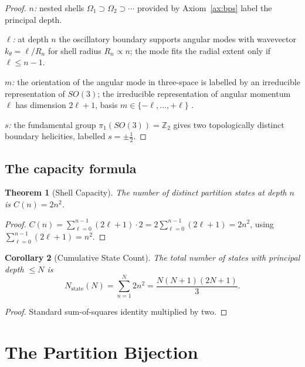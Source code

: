 \documentclass[twocolumn,10pt,a4paper]{article}
\theoremstyle{thmstyle}
\newtheorem{theorem}{Theorem}[section]
\newtheorem{corollary}[theorem]{Corollary}
\theoremstyle{definition}
\theoremstyle{remark}
\begin{document}
\begin{proof}
\emph{$n$:} nested shells $\Omega_{1}\supset\Omega_{2}\supset\cdots$
provided by Axiom~\ref{ax:bps} label the principal depth.

\emph{$\ell$:} at depth $n$ the oscillatory boundary supports angular
modes with wavevector $k_{\theta}=\ell/R_{n}$ for shell radius
$R_{n}\propto n$; the mode fits the radial extent only if
$\ell\leq n-1$.

\emph{$m$:} the orientation of the angular mode in three-space is
labelled by an irreducible representation of $SO(3)$; the irreducible
representation of angular momentum $\ell$ has dimension $2\ell+1$,
basis $m\in\{-\ell,\ldots,+\ell\}$ \citep{hall2015}.

\emph{$s$:} the fundamental group $\pi_{1}(SO(3))=\mathbb{Z}_{2}$
\citep{nakahara2003} gives two topologically distinct boundary
helicities, labelled $s=\pm\tfrac{1}{2}$.
\end{proof}

\subsection{The capacity formula}

\begin{theorem}[Shell Capacity]
\label{thm:cap}
The number of distinct partition states at depth $n$ is
$C(n)=2n^{2}$.
\end{theorem}

\begin{proof}
$C(n)=\sum_{\ell=0}^{n-1}(2\ell+1)\cdot 2=2\sum_{\ell=0}^{n-1}(2\ell+1)
=2n^{2}$, using $\sum_{\ell=0}^{n-1}(2\ell+1)=n^{2}$.
\end{proof}

\begin{corollary}[Cumulative State Count]
\label{cor:cum}
The total number of states with principal depth $\leq N$ is
\begin{equation}
N_{\mathrm{state}}(N)=\sum_{n=1}^{N}2n^{2}=\frac{N(N+1)(2N+1)}{3}.
\label{eq:Ns}
\end{equation}
\end{corollary}

\begin{proof}
Standard sum-of-squares identity multiplied by two.
\end{proof}

\section{The Partition Bijection}
\label{sec:bijection}
\end{document}
